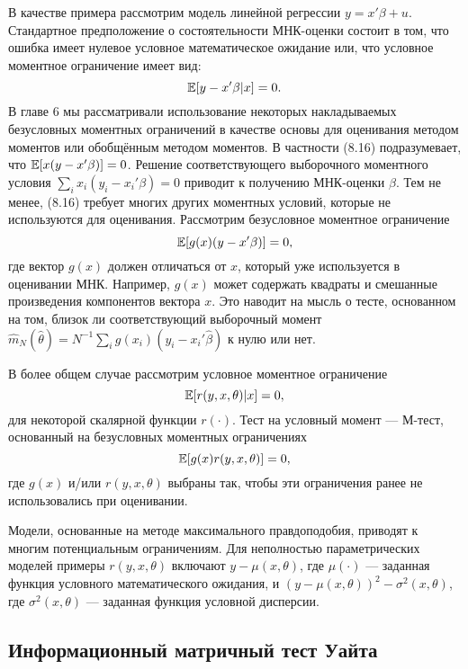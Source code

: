 В качестве примера рассмотрим модель линейной регрессии $y = x'\beta + u$. Стандартное предположение о состоятельности МНК-оценки состоит в том, что ошибка имеет нулевое условное математическое ожидание или, что  условное моментное ограничение имеет вид:
\begin{equation}
\mathbb{E}[y - x'\beta|x] = 0.
\end{equation}
В главе 6 мы рассматривали использование некоторых накладываемых безусловных моментных ограничений в качестве основы для оценивания методом моментов или обобщённым методом моментов. В частности (8.16) подразумевает, что $\mathbb{E}[x(y - x'\beta)] = 0$. Решение соответствующего выборочного моментного условия $\sum_i x_i(y_i - x_i'\beta) = 0$ приводит к получению МНК-оценки $\beta$. Тем не менее, (8.16) требует многих других моментных условий, которые не используются для оценивания. Рассмотрим безусловное моментное ограничение
\[
\mathbb{E}[g(x)(y - x'\beta)] = 0,
\]
где вектор $g(x)$ должен отличаться от $x$, который уже используется в оценивании МНК. Например, $g(x)$ может содержать квадраты и смешанные произведения компонентов вектора $x$. Это наводит на мысль о тесте, основанном на том, близок ли соответствующий выборочный момент $\hat{m}_N(\hat{\theta}) = N^{-1}\sum_i g(x_i)(y_i - x_i'\hat{\beta})$ к нулю или нет.

В более общем случае рассмотрим условное моментное ограничение
\begin{equation}
\mathbb{E}[r(y, x, \theta)|x] = 0,
\end{equation}
для некоторой скалярной функции $r(\cdot)$. Тест на условный момент --- М-тест, основанный на безусловных моментных ограничениях
\begin{equation}
\mathbb{E}[g(x)r(y, x, \theta)] = 0,
\end{equation}
где $g(x)$ и/или $r(y, x, \theta)$ выбраны так, чтобы эти ограничения ранее не использовались при оценивании.

Модели, основанные на методе максимального правдоподобия, приводят к многим потенциальным ограничениям. Для неполностью параметрических моделей примеры $r(y, x, \theta)$ включают $y - \mu(x, \theta)$, где $\mu(\cdot)$ --- заданная функция условного математического ожидания, и $(y - \mu(x, \theta))^2 - \sigma^2(x, \theta)$, где $\sigma^2(x, \theta)$ --- заданная функция условной дисперсии.

\subsection{Информационный матричный тест Уайта}

